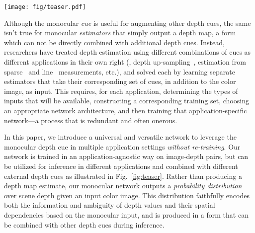 \documentclass[10pt,twocolumn,letterpaper]{article}
\begin{document}
\begin{figure*}[!t]
  \begin{center}
    \texttt{[image: fig/teaser.pdf]}
  \end{center}
  \caption{Overview of our approach. Given an input color image, we use a common task-agnostic network to output a joint probability distribution $p(\mathbf{Z}|\mathbf{I})$ over the depth map---formed as a sample approximation using outputs of a conditional VAE that generates plausible estimates for depth in overlapping patches. The mean of this distribution represents a standard monocular depth estimate, but the distribution itself can be used to solve a variety of inference tasks in different application settings---including leveraging additional depth cues to yield improved estimates. All these applications are enabled by a common model, \emph{that is trained only once}.}
  \label{fig:teaser}
\end{figure*}

Although the monocular \emph{cue} is useful for augmenting other depth cues, the same isn't true for monocular \emph{estimators} that simply output a depth map, a form which can not be directly combined with additional depth cues. Instead, researchers have treated depth estimation using different combinations of cues as different applications in their own right (\eg, depth up-sampling~\cite{chen2018estimating}, estimation from sparse~\cite{ma2018sparse} and line~\cite{liao2017sparse} measurements, etc.), and solved each by learning separate estimators that take their corresponding set of cues, in addition to the color image, as input. This requires, for each application, determining the types of inputs that will be available, constructing a corresponding training set, choosing an appropriate network architecture, and then training that application-specific network---a process that is redundant and often onerous.

In this paper, we introduce a universal and versatile network to leverage the monocular depth cue in multiple application settings \emph{without re-training}. Our network is trained in an application-agnostic way on image-depth pairs, but can be utilized for inference in different applications and combined with different external depth cues as illustrated in Fig.~\ref{fig:teaser}. Rather than producing a depth map estimate, our monocular network outputs a \emph{probability distribution} over scene depth given an input color image. This distribution faithfully encodes both the information and ambiguity of depth values and their spatial dependencies based on the monocular input, and is produced in a form that can be combined with other depth cues during inference.
\end{document}
